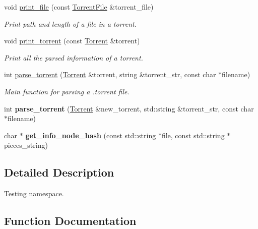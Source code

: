 \begin{DoxyCompactItemize}
void \hyperlink{namespacetorr_a86e0a9eb7815111ee9ab4b41e3edeca6}{print\+\_\+file} (const \hyperlink{structtorr_1_1TorrentFile}{Torrent\+File} \&torrent\+\_\+file)
\begin{DoxyCompactList}\small\item\em Print path and length of a file in a torrent. \end{DoxyCompactList}\item 
void \hyperlink{namespacetorr_a8f9d5e0b3e7590d0dd115cda74088eef}{print\+\_\+torrent} (const \hyperlink{structtorr_1_1Torrent}{Torrent} \&torrent)
\begin{DoxyCompactList}\small\item\em Print all the parsed information of a torrent. \end{DoxyCompactList}\item 
int \hyperlink{namespacetorr_aadd7f7bbd463cb3b941f548ffd3f7ee1}{parse\+\_\+torrent} (\hyperlink{structtorr_1_1Torrent}{Torrent} \&torrent, string \&torrent\+\_\+str, const char $\ast$filename)
\begin{DoxyCompactList}\small\item\em Main function for parsing a .torrent file. \end{DoxyCompactList}\item 
\mbox{\label{namespacetorr_a6309aedbc4feec9c0e036a06d2ffdc41}} 
int {\bfseries parse\+\_\+torrent} (\hyperlink{structtorr_1_1Torrent}{Torrent} \&new\+\_\+torrent, std\+::string \&torrent\+\_\+str, const char $\ast$filename)
\item 
\mbox{\label{namespacetorr_aea0adcfadf439eed53ca01a555855f04}} 
char $\ast$ {\bfseries get\+\_\+info\+\_\+node\+\_\+hash} (const std\+::string $\ast$file, const std\+::string $\ast$pieces\+\_\+string)
\end{DoxyCompactItemize}


\subsection{Detailed Description}
Testing namespace. 

\subsection{Function Documentation}
\mbox{\label{namespacetorr_ae283dfa60401ce3a0030abbc93508e88}} 
